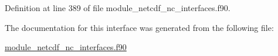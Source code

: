 Definition at line 389 of file module\+\_\+netcdf\+\_\+nc\+\_\+interfaces.\+f90.



The documentation for this interface was generated from the following file\+:\begin{DoxyCompactItemize}
\item 
\hyperlink{module__netcdf__nc__interfaces_8f90}{module\+\_\+netcdf\+\_\+nc\+\_\+interfaces.\+f90}\end{DoxyCompactItemize}
